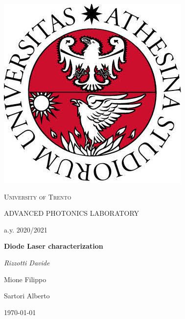 \documentclass[
10pt, %
oneside, %
headinclude,footinclude, %
BCOR5mm, %
]{article}
\begin{document}
\begin{titlepage}
	\vspace{2cm}
	\centering
	\includegraphics[scale=0.4]{Figures/unnamed.jpg}\\
	{\scshape\LARGE University of Trento\par}
	\vspace{2cm}
		{\scshape\Large ADVANCED PHOTONICS LABORATORY \par \newline
	a.y. 2020/2021 \par}
	\vspace{1cm}
	{\huge\bfseries Diode Laser characterization  \par}
	\vspace{1cm}
	{\Large\itshape Rizzotti Davide \par Mione Filippo \par Sartori Alberto }
	
	\vfill

	{\large \today\par}
\end{titlepage}

\newpage
\tableofcontents
\newpage

\begin{abstract}
    The aim of the experience is twofold: on one side the emission properties of a laser diode are characterized thought the analysis of the optical spectrum. On the other side the experimental apparatus is controlled via a custom made application written in LabView. 
    At first the experimental apparatus and the control application are tested, then the laser emission spectrum are acquired for different operating regimes by varying the temperature and the current of the diode. Finally the data are analyzed in order to determine laser diode fundamental parameters such as conversion rate, external quantum efficiency, characteristic temperature, spectral characteristics and some interesting features such as mode hooping of multimode laser. 
\end{abstract}
\end{document}
